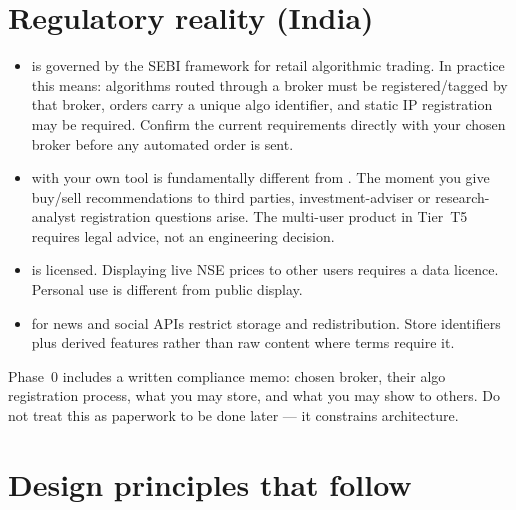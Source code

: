 \section{Regulatory reality (India)}

\begin{itemize}
\item {} is governed by the SEBI
framework for retail algorithmic trading. In practice this means: algorithms
routed through a broker must be registered/tagged by that broker, orders carry
a unique algo identifier, and static IP registration may be required. Confirm
the current requirements directly with your chosen broker before any automated
order is sent.
\item {} with your own tool is fundamentally
different from . The moment you
give buy/sell recommendations to third parties, investment-adviser or
research-analyst registration questions arise. The multi-user product in Tier~T5
requires legal advice, not an engineering decision.
\item {} is licensed. Displaying live NSE
prices to other users requires a data licence. Personal use is different from
public display.
\item {} for news and social APIs restrict storage
and redistribution. Store identifiers plus derived features rather than raw
content where terms require it.
\end{itemize}

\begin{warnbox}[title={Action item, not a footnote}]
Phase~0 includes a written compliance memo: chosen broker, their algo
registration process, what you may store, and what you may show to others.
Do not treat this as paperwork to be done later --- it constrains architecture.
\end{warnbox}

\section{Design principles that follow}


